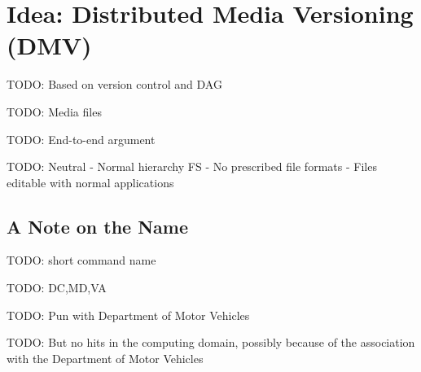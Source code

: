 \chapter{Idea: Distributed Media Versioning (DMV)}

TODO: Based on version control and DAG

TODO: Media files

TODO: End-to-end argument

TODO: Neutral
    - Normal hierarchy FS
    - No prescribed file formats
    - Files editable with normal applications


\section{A Note on the Name}

TODO: short command name

TODO: DC,MD,VA

TODO: Pun with Department of Motor Vehicles

TODO: But no hits in the computing domain, possibly because of the association
with the Department of Motor Vehicles
